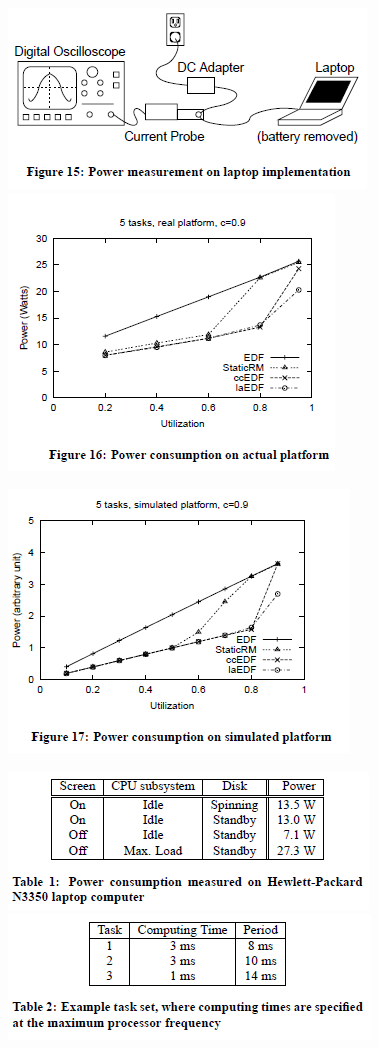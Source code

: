 \documentclass[11pt
  , a4paper
  , article
  , oneside
]{memoir}
\begin{document}
\begin{figure}[h!]
	\centering
	\includegraphics{./images/fig15.png}
	\includegraphics{./images/fig16.png}
\end{figure}
\begin{figure}[h!]
	\centering
	\includegraphics{./images/fig17.png}
\end{figure}

\begin{figure}[h!]
	\centering
	\includegraphics{./images/table1.png}
	\includegraphics{./images/table2.png}
\end{figure}
\end{document}
